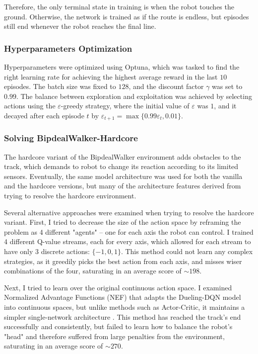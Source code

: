 \documentclass{article}
\begin{document}
\begin{multicols}{2}
Therefore, the only terminal state in training is when the robot touches the ground. Otherwise, the network is trained as if the route is endless, but episodes still end whenever the robot reaches the final line.

\subsubsection{Hyperparameters Optimization}
Hyperparameters were optimized using Optuna, which was tasked to find the right learning rate for achieving the highest average reward in the last $10$ episodes. The batch size was fixed to $128$, and the discount factor $\gamma$ was set to $0.99$.
The balance between exploration and exploitation was achieved by selecting actions using the $\varepsilon$-greedy strategy, where the initial value of $\varepsilon$ was $1$, and it decayed after each episode $t$ by $\varepsilon_{t+1} = \max\{0.99\varepsilon_t, 0.01\}$.

\subsubsection{Solving BipdealWalker-Hardcore}
The hardcore variant of the BipdealWalker environment adds obstacles to the track, which demands to robot to change its reaction according to its limited sensors. Eventually, the same model architecture was used for both the vanilla and the hardcore versions, but many of the architecture features derived from trying to resolve the hardcore environment.

Several alternative approaches were examined when trying to resolve the hardcore variant. 
First, I tried to decrease the size of the action space by reframing the problem as 4 different "agents" -- one for each axis the robot can control. I trained 4 different Q-value streams, each for every axis, which allowed for each stream to have only 3 discrete actions: $\{-1, 0, 1\}$. This method could not learn any complex strategies, as it greedily picks the best action from each axis, and misses wiser combinations of the four, saturating in an average score of $\sim 198$.

Next, I tried to learn over the original continuous action space. I examined Normalized Advantage Functions (NEF) that adapts the Dueling-DQN model into continuous spaces, but unlike methods such as Actor-Critic, it maintains a simpler single-network architecture \cite{NEF}. 
This method has reached the track's end successfully and consistently, but failed to learn how to balance the robot's "head" and therefore suffered from large penalties from the environment, saturating in an average score of $\sim 270$.


\end{multicols}
\end{document}
